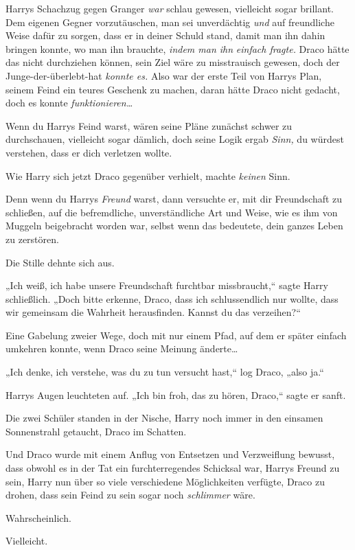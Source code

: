 {Harrys Schachzug gegen Granger \emph{war} schlau gewesen, vielleicht sogar brillant. Dem eigenen Gegner vorzutäuschen, man sei unverdächtig \emph{und} auf freundliche Weise dafür zu sorgen, dass er in deiner Schuld stand, damit man ihn dahin bringen konnte, wo man ihn brauchte, \emph{indem man ihn} \emph{einfach fragte.} Draco hätte das nicht durchziehen können, sein Ziel wäre zu misstrauisch gewesen, doch der Junge-der-überlebt-hat \emph{konnte es.} Also war der erste Teil von Harrys Plan, seinem Feind ein teures Geschenk zu machen, daran hätte Draco nicht gedacht, doch es konnte \emph{funktionieren…}

Wenn du Harrys Feind warst, wären seine Pläne zunächst schwer zu durchschauen, vielleicht sogar dämlich, doch seine Logik ergab \emph{Sinn,} du würdest verstehen, dass er dich verletzen wollte.

Wie Harry sich jetzt Draco gegenüber verhielt, machte \emph{keinen} Sinn.

Denn wenn du Harrys \emph{Freund} warst, dann versuchte er, mit dir Freundschaft zu schließen, auf die befremdliche, unverständliche Art und Weise, wie es ihm von Muggeln beigebracht worden war, selbst wenn das bedeutete, dein ganzes Leben zu zerstören.

Die Stille dehnte sich aus.

„Ich weiß, ich habe unsere Freundschaft furchtbar missbraucht,“ sagte Harry schließlich. „Doch bitte erkenne, Draco, dass ich schlussendlich nur wollte, dass wir gemeinsam die Wahrheit herausfinden. Kannst du das verzeihen?“

Eine Gabelung zweier Wege, doch mit nur einem Pfad, auf dem er später einfach umkehren konnte, wenn Draco seine Meinung änderte…

„Ich denke, ich verstehe, was du zu tun versucht hast,“ log Draco, „also ja.“

Harrys Augen leuchteten auf. „Ich bin froh, das zu hören, Draco,“ sagte er sanft.

Die zwei Schüler standen in der Nische, Harry noch immer in den einsamen Sonnenstrahl getaucht, Draco im Schatten.

Und Draco wurde mit einem Anflug von Entsetzen und Verzweiflung bewusst, dass obwohl es in der Tat ein furchterregendes Schicksal war, Harrys Freund zu sein, Harry nun über so viele verschiedene Möglichkeiten verfügte, Draco zu drohen, dass sein Feind zu sein sogar noch \emph{schlimmer} wäre.

Wahrscheinlich.

Vielleicht.

}
